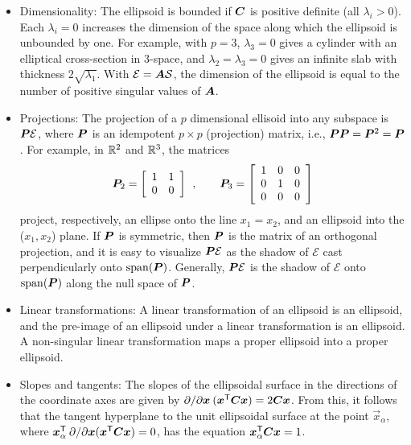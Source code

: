 \begin{itemize}
 \item Dimensionality: The ellipsoid is bounded if $\bm{C}$ is positive definite (all $\lambda_i > 0$).
 Each $\lambda_i = 0$ increases the dimension of the space along which the ellipsoid is unbounded by one.
For example, with $p=3$, $\lambda_3=0$ gives a
cylinder with an elliptical cross-section in 3-space, and  $\lambda_2 = \lambda_3=0$ gives an infinite slab with thickness $2 \sqrt{\lambda_1}$. With $\mathcal{E} = \bm{A} \mathcal{S}$, the dimension of the ellipsoid is equal to the number of positive singular values of $\bm{A}$.
 \item Projections: The projection of a $p$ dimensional ellisoid into any subspace
is $\bm{P} \mathcal{E}$, where
$\bm{P}$ is an idempotent $p \times p$ (projection) matrix, i.e., $\bm{P} \bm{P}= \bm{P}^2 = \bm{P}$.
For example, in $\mathbb{R}^{2}$ and $\mathbb{R}^{3}$,
the matrices
\[
\bm{P}_2 =
\left[
\begin{array}{cc}
 1 & 1  \\
 0 & 0  \\
\end{array}
\right]
\:\: , \quad\quad
\bm{P}_3 =
\left[
\begin{array}{ccc}
 1 & 0 & 0 \\
 0 & 1 & 0 \\
 0 & 0 & 0 \\
\end{array}
\right]
\]
project, respectively, an ellipse onto the line $x_1 = x_2$, and an ellipsoid into the ($x_1, x_2$) plane.  If $\bm{P}$ is symmetric, then $\bm{P}$ is the matrix of an orthogonal projection, and it is easy to visualize  $\bm{P} \mathcal{E}$ as the shadow of  $\mathcal{E}$ cast perpendicularly onto  $\mathrm{span}(\bm{P})$. Generally,  $\bm{P} \mathcal{E}$ is the shadow of $\mathcal{E}$  onto  $\mathrm{span}(\bm{P})$ along the null space of $\bm{P}$.

 \item Linear transformations: A linear transformation of an ellipsoid is an ellipsoid, and the pre-image of an ellipsoid under a linear transformation is an ellipsoid.  A non-singular linear transformation maps a proper ellipsoid into a proper ellipsoid.

 \item Slopes and tangents: The slopes of the ellipsoidal surface in the directions of the coordinate
 axes are given by $\partial / \partial \bm{x} \: (\bm{x}^\mathsf{T} \bm{C} \bm{x}) = 2 \bm{C} \bm{x}$.
 From this, it follows that the tangent hyperplane to the unit ellipsoidal surface at the point
 $\vec{x}_\alpha$, where $\bm{x}_\alpha^\mathsf{T} \: \partial / \partial \bm{x} (\bm{x}^\mathsf{T} \bm{C} \bm{x}) = 0$,
 has the equation $\bm{x}_\alpha ^\mathsf{T} \bm{C} \bm{x} = 1$.
\end{itemize}

